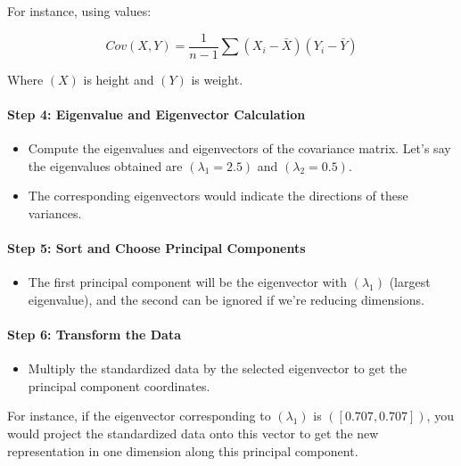 \documentclass[12pt]{book}
\providecommand{\tightlist}{%
  \setlength{\itemsep}{0pt}\setlength{\parskip}{0pt}}
\begin{document}
For instance, using values:

\[
Cov(X, Y) = \frac{1}{n-1} \sum (X_i - \bar{X})(Y_i - \bar{Y})
\]

Where \((X)\) is height and \((Y)\) is weight.

\paragraph{Step 4: Eigenvalue and Eigenvector
Calculation}\label{step-4-eigenvalue-and-eigenvector-calculation}

\begin{itemize}
\tightlist
\item
  Compute the eigenvalues and eigenvectors of the covariance matrix.
  Let's say the eigenvalues obtained are \((\lambda_{1} = 2.5)\) and
  \((\lambda_{2} = 0.5)\).
\item
  The corresponding eigenvectors would indicate the directions of these
  variances.
\end{itemize}

\paragraph{Step 5: Sort and Choose Principal
Components}\label{step-5-sort-and-choose-principal-components}

\begin{itemize}
\tightlist
\item
  The first principal component will be the eigenvector with \((\lambda_{1})\)
  (largest eigenvalue), and the second can be ignored if we're reducing
  dimensions.
\end{itemize}

\paragraph{Step 6: Transform the Data}\label{step-6-transform-the-data}

\begin{itemize}
\tightlist
\item
  Multiply the standardized data by the selected eigenvector to get the
  principal component coordinates.
\end{itemize}

For instance, if the eigenvector corresponding to \((\lambda_{1})\) is
\(([0.707, 0.707])\), you would project the standardized data onto this
vector to get the new representation in one dimension along this
principal component.
\end{document}
